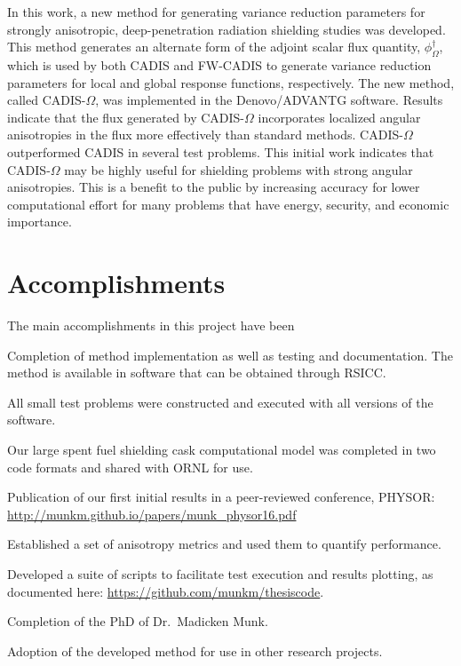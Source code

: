 \documentclass[12pt]{article}
\begin{document}
In this work, a new method for generating variance reduction parameters for strongly anisotropic, deep-penetration radiation shielding studies was developed. This method generates an alternate form of the adjoint scalar flux quantity, $\phi^{\dagger}_{\Omega}$, which is used by both CADIS and FW-CADIS to generate variance reduction parameters for local and global response functions, respectively. The new method, called CADIS-$\Omega$, was implemented in the Denovo/ADVANTG software. Results indicate that the flux generated by CADIS-$\Omega$ incorporates localized angular anisotropies in the flux more effectively than standard methods. CADIS-$\Omega$ outperformed CADIS in several test problems. This initial work indicates that CADIS-$\Omega$ may be highly useful for shielding problems with strong angular anisotropies. This is a benefit to the public by increasing accuracy for lower computational effort for many problems that have energy, security, and economic importance. 

\clearpage


\section{Accomplishments}
\label{sect::accomplishments}

The main accomplishments in this project have been 
\begin{compactitem}
\item Completion of method implementation as well as testing and documentation. The method is available in software that can be obtained through RSICC.
\item All small test problems were constructed and executed with all versions of the software. 
\item Our large spent fuel shielding cask computational model was completed in two code formats and shared with ORNL for use.
\item Publication of our first initial results in a peer-reviewed conference, PHYSOR: \url{http://munkm.github.io/papers/munk\_physor16.pdf}
\item Established a set of anisotropy metrics and used them to quantify performance. 
\item Developed a suite of scripts to facilitate test execution and results plotting, as documented here: \url{https://github.com/munkm/thesiscode}.
\item Completion of the PhD of Dr.\ Madicken Munk.
\item Adoption of the developed method for use in other research projects.
\end{compactitem}
\end{document}
